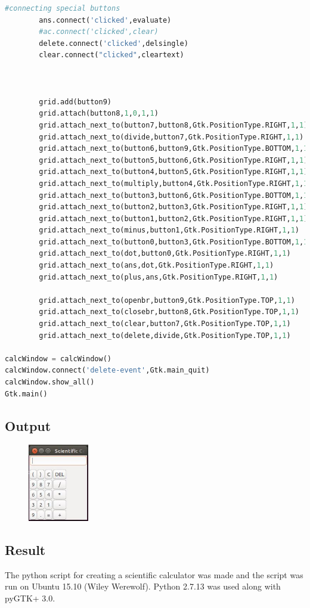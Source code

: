 \documentclass{article}
\begin{document}
\begin{lstlisting}[language=python, basicstyle = \tiny ]
		#connecting special buttons
		ans.connect('clicked',evaluate)
		#ac.connect('clicked',clear)
		delete.connect('clicked',delsingle)
		clear.connect("clicked",cleartext)



		grid.add(button9)
		grid.attach(button8,1,0,1,1)
		grid.attach_next_to(button7,button8,Gtk.PositionType.RIGHT,1,1)
		grid.attach_next_to(divide,button7,Gtk.PositionType.RIGHT,1,1)
		grid.attach_next_to(button6,button9,Gtk.PositionType.BOTTOM,1,1)
		grid.attach_next_to(button5,button6,Gtk.PositionType.RIGHT,1,1)
		grid.attach_next_to(button4,button5,Gtk.PositionType.RIGHT,1,1)
		grid.attach_next_to(multiply,button4,Gtk.PositionType.RIGHT,1,1)
		grid.attach_next_to(button3,button6,Gtk.PositionType.BOTTOM,1,1)
		grid.attach_next_to(button2,button3,Gtk.PositionType.RIGHT,1,1)
		grid.attach_next_to(button1,button2,Gtk.PositionType.RIGHT,1,1)
		grid.attach_next_to(minus,button1,Gtk.PositionType.RIGHT,1,1)
		grid.attach_next_to(button0,button3,Gtk.PositionType.BOTTOM,1,1)
		grid.attach_next_to(dot,button0,Gtk.PositionType.RIGHT,1,1)
		grid.attach_next_to(ans,dot,Gtk.PositionType.RIGHT,1,1)
		grid.attach_next_to(plus,ans,Gtk.PositionType.RIGHT,1,1)

		grid.attach_next_to(openbr,button9,Gtk.PositionType.TOP,1,1)
		grid.attach_next_to(closebr,button8,Gtk.PositionType.TOP,1,1)
		grid.attach_next_to(clear,button7,Gtk.PositionType.TOP,1,1)
		grid.attach_next_to(delete,divide,Gtk.PositionType.TOP,1,1)

calcWindow = calcWindow()
calcWindow.connect('delete-event',Gtk.main_quit)
calcWindow.show_all()
Gtk.main()			
\end{lstlisting}

\subsection{Output}
\begin{figure}[h!]
	\includegraphics[width=100px]{./outputs/scicalc.jpg}
\end{figure}

\newpage

\subsection{Result}
The python script for creating a scientific calculator was made and the script was run on Ubuntu 15.10 (Wiley Werewolf). Python 2.7.13 was used along with pyGTK+ 3.0.

\begin{refsection}
\cite{pyGTK}
\printbibliography
\end{refsection} 

\newpage
{}

\cite{github}
\printbibliography
 
\end{document}
